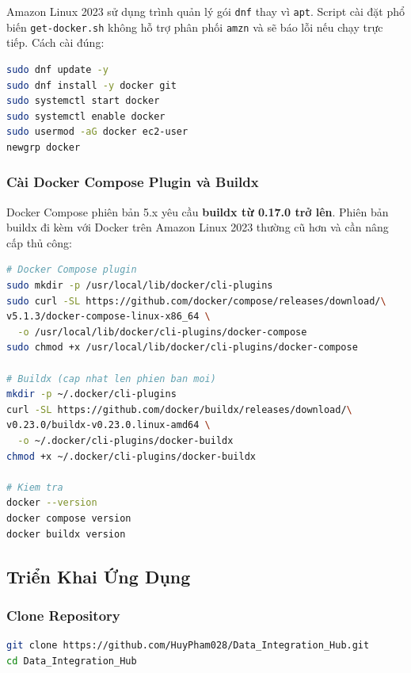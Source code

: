 Amazon Linux 2023 sử dụng trình quản lý gói \texttt{dnf} thay vì
\texttt{apt}. Script cài đặt phổ biến \texttt{get-docker.sh} không hỗ trợ
phân phối \texttt{amzn} và sẽ báo lỗi nếu chạy trực tiếp. Cách cài đúng:

\begin{lstlisting}[language=bash, caption={Cài Docker trên Amazon Linux 2023}]
sudo dnf update -y
sudo dnf install -y docker git
sudo systemctl start docker
sudo systemctl enable docker
sudo usermod -aG docker ec2-user
newgrp docker
\end{lstlisting}

\subsubsection{Cài Docker Compose Plugin và Buildx}

Docker Compose phiên bản 5.x yêu cầu \textbf{buildx từ 0.17.0 trở lên}.
Phiên bản buildx đi kèm với Docker trên Amazon Linux 2023 thường cũ hơn
và cần nâng cấp thủ công:

\begin{lstlisting}[language=bash,
    caption={Cài Docker Compose plugin và buildx}]
# Docker Compose plugin
sudo mkdir -p /usr/local/lib/docker/cli-plugins
sudo curl -SL https://github.com/docker/compose/releases/download/\
v5.1.3/docker-compose-linux-x86_64 \
  -o /usr/local/lib/docker/cli-plugins/docker-compose
sudo chmod +x /usr/local/lib/docker/cli-plugins/docker-compose

# Buildx (cap nhat len phien ban moi)
mkdir -p ~/.docker/cli-plugins
curl -SL https://github.com/docker/buildx/releases/download/\
v0.23.0/buildx-v0.23.0.linux-amd64 \
  -o ~/.docker/cli-plugins/docker-buildx
chmod +x ~/.docker/cli-plugins/docker-buildx

# Kiem tra
docker --version
docker compose version
docker buildx version
\end{lstlisting}

\subsection{Triển Khai Ứng Dụng}

\subsubsection{Clone Repository}

\begin{lstlisting}[language=bash]
git clone https://github.com/HuyPham028/Data_Integration_Hub.git
cd Data_Integration_Hub
\end{lstlisting}

